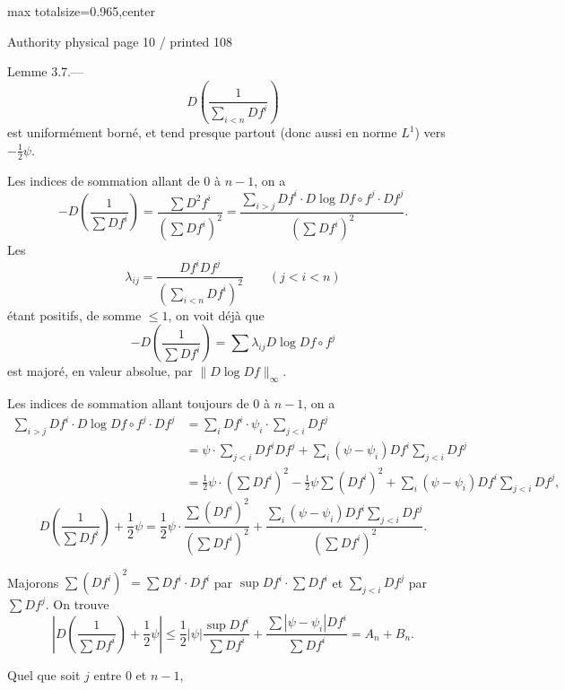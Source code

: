 \documentclass{article}
\begin{document}
\newpage
\noindent\begin{adjustbox}{max totalsize={\textwidth}{0.965\textheight},center}\begin{minipage}{\textwidth}
\noindent\hfill\scriptsize Authority physical page 10 / printed 108\par\normalsize
Lemme 3.7.—
\[
D\left(\frac1{\sum_{i<n}Df^i}\right)
\]
est uniformément borné, et tend presque partout (donc aussi en norme \(L^1\)) vers \(-\frac12\psi\).

Les indices de sommation allant de \(0\) à \(n-1\), on a
\[
-D\left(\frac1{\sum Df^i}\right)
=\frac{\sum D^2f^i}{(\sum Df^i)^2}
=\frac{\sum_{i>j}Df^i\cdot D\log Df\circ f^j\cdot Df^j}{(\sum Df^i)^2}.
\]
Les
\[
\lambda_{ij}=\frac{Df^iDf^j}{\left(\sum_{i<n}Df^i\right)^2}\qquad(j<i<n)
\]
étant positifs, de somme \(\leq1\), on voit déjà que
\[
-D\left(\frac1{\sum Df^i}\right)=\sum\lambda_{ij}D\log Df\circ f^j
\]
est majoré, en valeur absolue, par \(\|D\log Df\|_\infty\).

Les indices de sommation allant toujours de \(0\) à \(n-1\), on a
\[
\begin{aligned}
\sum_{i>j}Df^i\cdot D\log Df\circ f^j\cdot Df^j
&=\sum_iDf^i\cdot\psi_i\cdot\sum_{j<i}Df^j\\
&=\psi\cdot\sum_{j<i}Df^iDf^j+\sum_i(\psi-\psi_i)Df^i\sum_{j<i}Df^j\\
&=\frac12\psi\cdot\left(\sum Df^i\right)^2-\frac12\psi\sum(Df^i)^2
+\sum_i(\psi-\psi_i)Df^i\sum_{j<i}Df^j,
\end{aligned}
\]
\[
D\left(\frac1{\sum Df^i}\right)+\frac12\psi
=\frac12\psi\cdot\frac{\sum(Df^i)^2}{(\sum Df^i)^2}
+\frac{\sum_i(\psi-\psi_i)Df^i\sum_{j<i}Df^j}{(\sum Df^i)^2}.
\]

Majorons \(\sum(Df^i)^2=\sum Df^i\cdot Df^i\) par \(\sup Df^i\cdot\sum Df^i\) et \(\sum_{j<i}Df^j\) par \(\sum Df^j\). On trouve
\[
\left|D\left(\frac1{\sum Df^i}\right)+\frac12\psi\right|
\leq\frac12|\psi|\frac{\sup Df^i}{\sum Df^i}
+\frac{\sum|\psi-\psi_i|Df^i}{\sum Df^i}
=A_n+B_n.
\]

Quel que soit \(j\) entre \(0\) et \(n-1\),
\end{minipage}\end{adjustbox}
\end{document}
